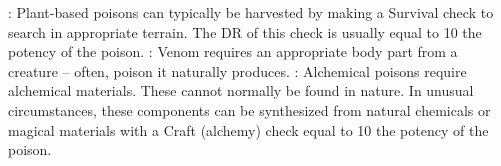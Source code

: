 \begin{itemize}
    : Plant-based poisons can typically be harvested by making a Survival check to search in appropriate terrain.
        The DR of this check is usually equal to 10 \add the potency of the poison.
    : Venom requires an appropriate body part from a creature -- often, poison it naturally produces.
    : Alchemical poisons require alchemical materials.
        These cannot normally be found in nature.
        In unusual circumstances, these components can be synthesized from natural chemicals or magical materials with a Craft (alchemy) check equal to 10 \add the potency of the poison.
\end{itemize}
